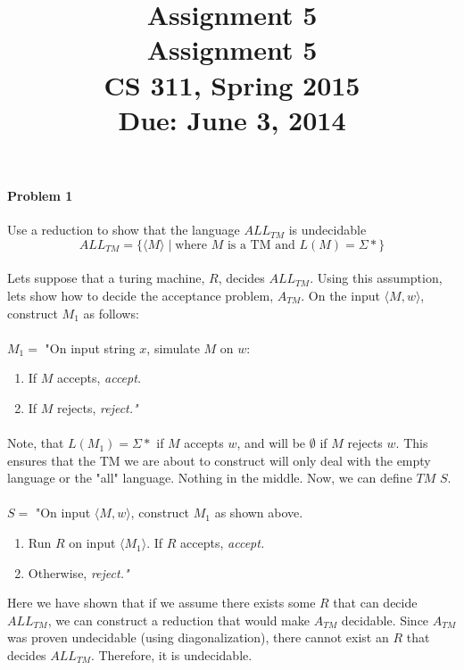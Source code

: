 \documentclass{article}
\title{\vspace{-3ex} \bf Assignment 5 \\[1ex]}
\title{\vspace{-3ex} \bf Assignment 5 \\[1ex]\rm\normalsize CS 311, Spring 2015 \\ Due: June 3, 2014}
\date{}
\author{}
\begin{document}
\maketitle
\paragraph{Problem 1} Use a reduction to show that the language $ALL_{TM}$ is undecidable
\[ALL_{TM} = \{ \langle M \rangle \;|\; \mbox{where $M$ is a TM and $L(M) = \Sigma*$} \}\]

\paragraph{} Lets suppose that a turing machine, $R$, decides $ALL_{TM}$. Using this assumption, lets show how to decide the acceptance problem, $A_{TM}$.  On the input $\langle M,w\rangle$, construct $M_1$ as follows:
\\\\
\noindent $M_1 = $ "On input string $x$, simulate $M$ on $w$: 
    \begin{enumerate}[\indent 1.]
    \item If $M$ accepts, \em accept.\em
    \item If $M$ rejects, \em reject."
    \end{enumerate}
\paragraph{} Note, that $L(M_1) = \Sigma*$ if $M$ accepts $w$, and will be $\emptyset$ if $M$ rejects $w$. This ensures that the TM we are about to construct will only deal with the empty language or the "all" language. Nothing in the middle. Now, we can define $TM$ $S$.
\\\\
\noindent $S = $ "On input $\langle M,w\rangle$, construct $M_1$ as shown above.
	\begin{enumerate}[\indent 1.]
	\item Run $R$ on input $\langle M_1\rangle$. If $R$ accepts, \em accept.\em
	\item Otherwise, \em reject."\em\\
	\end{enumerate}
\noindent Here we have shown that if we assume there exists some $R$ that can decide $ALL_{TM}$, we can construct a reduction that would make $A_{TM}$ decidable. Since $A_{TM}$ was proven undecidable (using diagonalization), there cannot exist an $R$ that decides $ALL_{TM}$. Therefore, it is undecidable.
\end{document}
